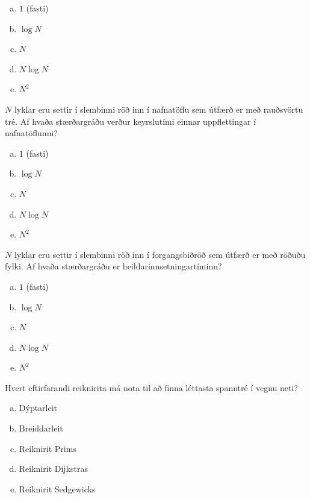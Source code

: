 \documentclass[addpoints]{exam}
\begin{document}
\begin{questions}
	\begin{multicols}{5}
		\begin{enumerate}[a)]
			\item $1$ (fasti)
			\item $\log N$
			\item $N$
			\item $N\log N$
			\item $N^2$ %
		\end{enumerate}
	\end{multicols}

	\question[3]
	$N$ lyklar eru settir í slembinni röð inn í nafnatöflu sem útfærð er með rauðsvörtu tré. Af hvaða stærðargráðu verður keyrslutími einnar uppflettingar í nafnatöflunni?

	\begin{multicols}{5}
		\begin{enumerate}[a)]
			\item $1$ (fasti)
			\item $\log N$ %
			\item $N$
			\item $N\log N$
			\item $N^2$
		\end{enumerate}
	\end{multicols}

	\question[3]
	$N$ lyklar eru settir í slembinni röð inn í forgangsbiðröð sem útfærð er með röðuðu fylki. Af hvaða stærðargráðu er heildarinnsetningartíminn?

	\begin{multicols}{5}
		\begin{enumerate}[a)]
			\item $1$ (fasti)
			\item $\log N$
			\item $N$
			\item $N\log N$
			\item $N^2$ %
		\end{enumerate}
	\end{multicols}

	\newpage

	\question[3]

	Hvert eftirfarandi reiknirita má nota til að finna léttasta spanntré í vegnu neti?

	\begin{enumerate}[a)]
		\item Dýptarleit
		\item Breiddarleit
		\item Reiknirit Prims %
		\item Reiknirit Dijkstras
		\item Reiknirit Sedgewicks
	\end{enumerate}


\end{questions}
\end{document}
